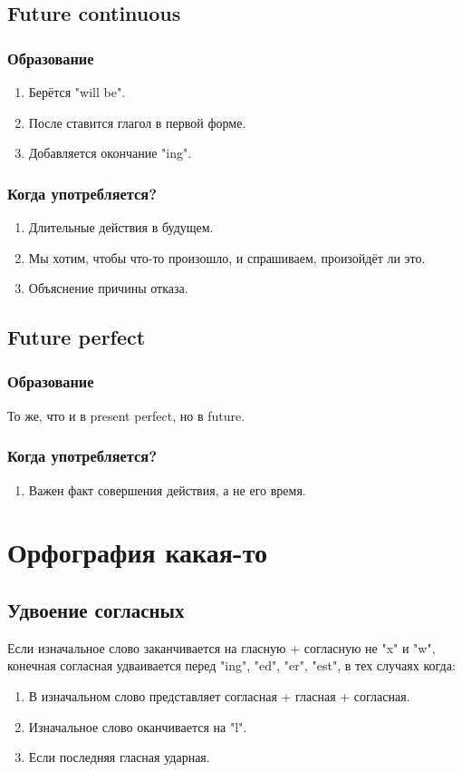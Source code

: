 \documentclass[oneside]{book}
\begin{document}
	\section{Future continuous}
	\subsection{Образование}
	\begin{enumerate}
		\item Берётся "will be".
		\item После ставится глагол в первой форме.
		\item Добавляется окончание "ing".
	\end{enumerate}

	\subsection{Когда употребляется?}
	\begin{enumerate}
		\item Длительные действия в будущем.
		\item Мы хотим, чтобы что-то произошло, и спрашиваем, произойдёт ли это.
		\item Объяснение причины отказа.
	\end{enumerate}

	\section{Future perfect}
	\subsection{Образование}
	То же, что и в present perfect, но в future.

	\subsection{Когда употребляется?}
	\begin{enumerate}
		\item Важен факт совершения действия, а не его время.
	\end{enumerate}

	\chapter{Орфография какая-то}
	\section{Удвоение согласных}
	Если изначальное слово заканчивается на гласную + согласную не "x" и "w", конечная
	согласная удваивается перед "ing"{}, "ed"{}, "er"{}, "est"{},
	в тех случаях когда:
	\begin{enumerate}
		\item В изначальном слово представляет согласная + гласная + согласная.
		\item Изначальное слово оканчивается на "l".
		\item Если последняя гласная ударная.
	\end{enumerate}
\end{document}
